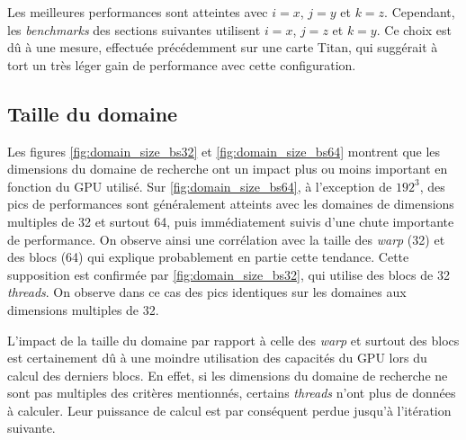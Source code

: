 Les meilleures performances sont atteintes avec $i=x$, $j=y$ et $k=z$. Cependant, les \textit{benchmarks} des sections suivantes utilisent $i=x$, $j=z$ et $k=y$. Ce choix est dû à une mesure, effectuée précédemment sur une carte Titan, qui suggérait à tort un très léger gain de performance avec cette configuration.

\subsection{Taille du domaine}
Les figures \ref{fig:domain_size_bs32} et \ref{fig:domain_size_bs64} montrent que les dimensions du domaine de recherche ont un impact plus ou moins important en fonction du \acs{GPU} utilisé. Sur \ref{fig:domain_size_bs64}, à l'exception de $192^3$, des pics de performances sont généralement atteints avec les domaines de dimensions multiples de 32 et surtout 64, puis immédiatement suivis d'une chute importante de performance. On observe ainsi une corrélation avec la taille des \textit{warp} (32) et des blocs (64) qui explique probablement en partie cette tendance. Cette supposition est confirmée par \ref{fig:domain_size_bs32}, qui utilise des blocs de 32 \textit{threads}. On observe dans ce cas des pics identiques sur les domaines aux dimensions multiples de 32.

L'impact de la taille du domaine par rapport à celle des \textit{warp} et surtout des blocs est certainement dû à une moindre utilisation des capacités du \acs{GPU} lors du calcul des derniers blocs. En effet, si les dimensions du domaine de recherche ne sont pas multiples des critères mentionnés, certains \textit{threads} n'ont plus de données à calculer. Leur puissance de calcul est par conséquent perdue jusqu'à l'itération suivante.

